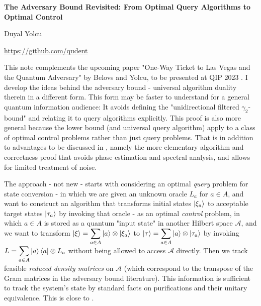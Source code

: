 \documentclass{article}
\begin{document}
\newtheorem{definition}{Definition}
\newtheorem{proposition}{Proposition}
\newtheorem{thm}{Theorem}

\begin{center}
\textbf{{\Large The Adversary Bound Revisited: From Optimal Query Algorithms to Optimal Control}}

Duyal Yolcu

\href{https://github.com/qudent}{https://github.com/qudent}
\end{center}


This note complements the upcoming paper "One-Way Ticket to Las Vegas and the Quantum Adversary" by Belovs and Yolcu, to be presented at QIP 2023 \cite{LasVegas}. I develop the ideas behind the adversary bound - universal algorithm duality therein in a different form. This form may be faster to understand for a general quantum information audience: It avoids defining the "unidirectional filtered $\gamma _{2}$-bound" and relating it to query algorithms explicitly. This proof is also more general because the lower bound (and universal query algorithm) apply to a class of optimal control problems rather than just query problems. That is in addition to advantages to be discussed in \cite{LasVegas}, namely the more elementary algorithm and correctness proof that avoids phase estimation and spectral analysis, and allows for limited treatment of noise.


The approach - not new - starts with considering an optimal \textit{query} problem for state conversion - in which we are given an unknown oracle $\displaystyle L_{a}$ for $\displaystyle a\in A$, and want to construct an algorithm that transforms initial states $\displaystyle \ket{\xi _{a}}$ to acceptable target states $\displaystyle \ket{\tau _{a}}$ by invoking that oracle - as an optimal \textit{control }problem, in which $\displaystyle a\in A$ is stored as a quantum "input state" in another Hilbert space $\displaystyle \mathcal{A}$, and we want to transform $\displaystyle \ket{\xi } =\sum _{a\in A}\ket{a} \otimes \ket{\xi _{a}}$ to $\displaystyle \ket{\tau } =\sum _{a\in A}\ket{a} \otimes \ket{\tau _{a}}$ by invoking $\displaystyle L=\sum _{a\in A}\ket{a}\bra{a} \otimes L_{a}$ without being allowed to access $\displaystyle \mathcal{A}$ directly. Then we track feasible \textit{reduced density matrices }on $\displaystyle \mathcal{A}$ (which correspond to the transpose of the Gram matrices in the adversary bound literature). This information is sufficient to track the system's state by standard facts on purifications and their unitary equivalence. This is close to \cite{BarnumQuantum, Barnum2007Semidefinite}.
\end{document}

